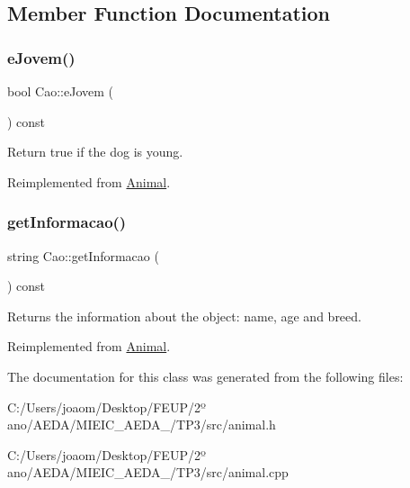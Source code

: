 \subsection{Member Function Documentation}
\mbox{\label{class_cao_afb98e22384401fa1c3b44537b5e28352}} 
\subsubsection{\texorpdfstring{e\+Jovem()}{eJovem()}}
{\footnotesize\ttfamily bool Cao\+::e\+Jovem (\begin{DoxyParamCaption}{ }\end{DoxyParamCaption}) const\hspace{0.3cm}{\ttfamily [virtual]}}

Return true if the dog is young. 

Reimplemented from \mbox{\hyperlink{class_animal_a13862612b8bcf972d764b0ef81b66324}{Animal}}.

\mbox{\label{class_cao_a5b2e5aff66f0c8a9076ef559c3862292}} 
\subsubsection{\texorpdfstring{get\+Informacao()}{getInformacao()}}
{\footnotesize\ttfamily string Cao\+::get\+Informacao (\begin{DoxyParamCaption}{ }\end{DoxyParamCaption}) const\hspace{0.3cm}{\ttfamily [virtual]}}

Returns the information about the object\+: name, age and breed. 

Reimplemented from \mbox{\hyperlink{class_animal_aee82faf16789092dc1fde106382e2b18}{Animal}}.



The documentation for this class was generated from the following files\+:\begin{DoxyCompactItemize}
\item 
C\+:/\+Users/joaom/\+Desktop/\+F\+E\+U\+P/2º ano/\+A\+E\+D\+A/\+M\+I\+E\+I\+C\+\_\+\+A\+E\+D\+A\+\_/\+T\+P3/src/animal.\+h\item 
C\+:/\+Users/joaom/\+Desktop/\+F\+E\+U\+P/2º ano/\+A\+E\+D\+A/\+M\+I\+E\+I\+C\+\_\+\+A\+E\+D\+A\+\_/\+T\+P3/src/animal.\+cpp\end{DoxyCompactItemize}
